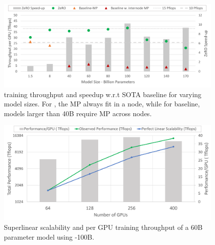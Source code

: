 \begin{figure}[t!]
 \begin{center}
 \includegraphics[width=1.0\columnwidth]{model_size_and_speedup.PNG}
 \caption{\name training throughput and speedup w.r.t SOTA baseline for varying model sizes.  For \name, the MP always fit in a node, while for baseline, models larger than 40B require MP across nodes.} 
 \label{fig:billion_parameter_speedup}
 \end{center}
 \end{figure}

\begin{figure}[t!]
 \begin{center}
 \includegraphics[width=1.0\columnwidth]{hyperscale_60B_model_v2.PNG}
 \caption{Superlinear scalability and per GPU training throughput of a 60B parameter model using \name-100B.} 
 \label{fig:hyperscale_60B}
 \end{center}
 \end{figure}


